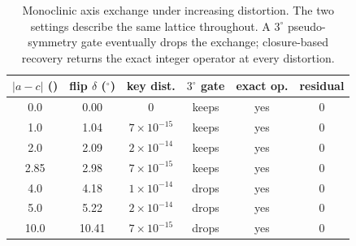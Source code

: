 \documentclass[preprint,pdf]{iucr}          %
\newcommand{\Ang}{\text{\AA}}
\begin{document}
\begin{table}
\caption{Monoclinic axis exchange under increasing distortion. The two settings describe the same lattice throughout. A $3^\circ$ pseudo-symmetry gate eventually drops the exchange; closure-based recovery returns the exact integer operator at every distortion.}
\label{tab:flip}
\begin{tabular}{cccccc}
$|a-c|$ (\Ang) & flip $\delta$ ($^\circ$) & key dist. & $3^\circ$ gate & exact op. & residual \\
\hline
0.0  & 0.00  & $0$ & keeps & yes & $0$ \\
1.0  & 1.04  & $7\times10^{-15}$ & keeps & yes & $0$ \\
2.0  & 2.09  & $2\times10^{-14}$ & keeps & yes & $0$ \\
2.85 & 2.98  & $7\times10^{-15}$ & keeps & yes & $0$ \\
4.0  & 4.18  & $1\times10^{-14}$ & drops & yes & $0$ \\
5.0  & 5.22  & $2\times10^{-14}$ & drops & yes & $0$ \\
10.0 & 10.41 & $7\times10^{-15}$ & drops & yes & $0$ \\
\end{tabular}
\end{table}
\end{document}
